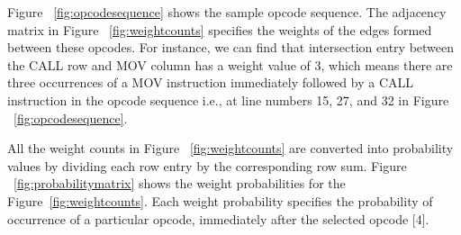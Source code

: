 Figure ~\ref{fig:opcodesequence} shows the sample opcode sequence. The adjacency matrix in Figure ~\ref{fig:weightcounts} specifies the weights of the edges formed between these opcodes. For instance, we can find that intersection entry between the CALL row and MOV column has a weight value of 3, which means there are three occurrences of a MOV instruction immediately followed by a CALL instruction in the opcode sequence i.e., at line numbers 15, 27, and 32 in Figure ~\ref{fig:opcodesequence}. 

All the weight counts in Figure ~\ref{fig:weightcounts} are converted into probability values by dividing each row entry by the corresponding row sum. Figure ~\ref{fig:probabilitymatrix} shows the weight probabilities for the Figure~\ref{fig:weightcounts}. Each weight probability specifies the probability of occurrence of a particular opcode, immediately after the selected opcode [4]. 

